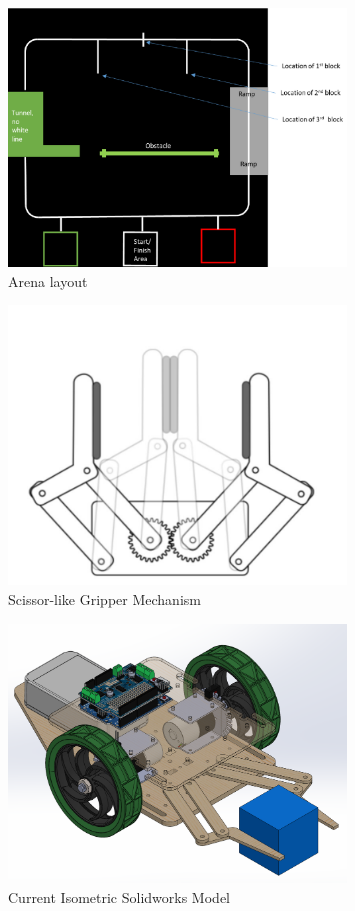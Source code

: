 \documentclass{article}
\begin{document}
\begin{figure}[!h]
    \centering
    \includegraphics[width=0.8\textwidth]{assets/arena.png}
    \caption{Arena layout}
    \label{fig:arena}
\end{figure}

\begin{figure}[!h]
    \centering
    \includegraphics[width=0.8\textwidth]{assets/Gripper_Mechanism.jpg}
    \caption{Scissor-like Gripper Mechanism}
    \label{fig:grip_mech}
\end{figure}

\begin{figure}[!h]
    \centering
    \includegraphics[width=0.8\textwidth]{assets/isometric.png}
    \caption{Current Isometric Solidworks Model}
    \label{fig:isometric}
\end{figure}
\end{document}
